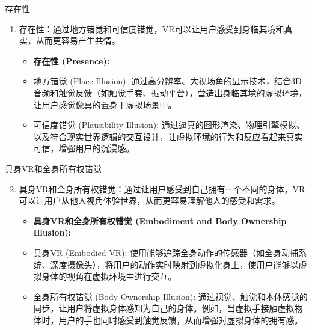 \documentclass[aspectratio=169,xcolor=dvipsnames]{beamer}
\begin{document}
\begin{frame}{存在性}
    \begin{enumerate}
        \item 存在性：通过地方错觉和可信度错觉，VR可以让用户感受到身临其境和真实，从而更容易产生共情。
        \begin{itemize}
            \item \textbf{存在性 (Presence):}
            \item 地方错觉 (Place Illusion): 通过高分辨率、大视场角的显示技术，结合3D音频和触觉反馈（如触觉手套、振动平台），营造出身临其境的虚拟环境，让用户感觉像真的置身于虚拟场景中。
            \item 可信度错觉 (Plausibility Illusion): 通过逼真的图形渲染、物理引擎模拟、以及符合现实世界逻辑的交互设计，让虚拟环境的行为和反应看起来真实可信，增强用户的沉浸感。
        \end{itemize}
    \end{enumerate}
\end{frame}

\begin{frame}{具身VR和全身所有权错觉}
    \begin{enumerate}
        \setcounter{enumi}{1}
        \item 具身VR和全身所有权错觉：通过让用户感受到自己拥有一个不同的身体，VR可以让用户从他人视角体验世界，从而更容易理解他人的感受和需求。
        \begin{itemize}
            \item \textbf{具身VR和全身所有权错觉 (Embodiment and Body Ownership Illusion):}
            \item 具身VR (Embodied VR): 使用能够追踪全身动作的传感器（如全身动捕系统、深度摄像头），将用户的动作实时映射到虚拟化身上，使用户能够以虚拟身体的视角在虚拟环境中进行交互。
            \item 全身所有权错觉 (Body Ownership Illusion): 通过视觉、触觉和本体感觉的同步，让用户将虚拟身体感知为自己的身体。例如，当虚拟手接触虚拟物体时，用户的手也同时感受到触觉反馈，从而增强对虚拟身体的拥有感。
        \end{itemize}
    \end{enumerate}
\end{frame}
\end{document}
